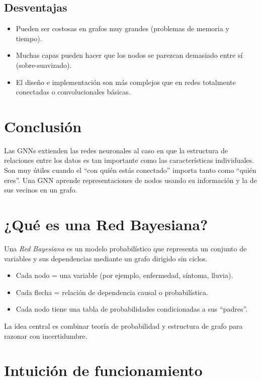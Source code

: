 \documentclass[8pt,a4paper]{article}
\begin{document}
\subsection*{Desventajas}
\begin{itemize}
    \item Pueden ser costosas en grafos muy grandes (problemas de memoria y tiempo).
    \item Muchas capas pueden hacer que los nodos se parezcan demasiado entre sí
    (sobre-suavizado).
    \item El diseño e implementación son más complejos que en redes totalmente conectadas
    o convolucionales básicas.
\end{itemize}

\section{Conclusión}

Las GNNs extienden las redes neuronales al caso en que la estructura de relaciones
entre los datos es tan importante como las características individuales.
Son muy útiles cuando el ``con quién estás conectado'' importa tanto como ``quién eres''. Una GNN aprende representaciones de nodos usando su información y la de sus vecinos en un grafo.

\newpage

\section{¿Qué es una Red Bayesiana?}

Una \emph{Red Bayesiana} es un modelo probabilístico que representa un conjunto
de variables y sus dependencias mediante un grafo dirigido sin ciclos.

\begin{itemize}
    \item Cada nodo = una variable (por ejemplo, enfermedad, síntoma, lluvia).
    \item Cada flecha = relación de dependencia causal o probabilística.
    \item Cada nodo tiene una tabla de probabilidades condicionadas a sus ``padres''.
\end{itemize}

La idea central es combinar teoría de probabilidad y estructura de grafo para
razonar con incertidumbre.

\section{Intuición de funcionamiento}
\end{document}
